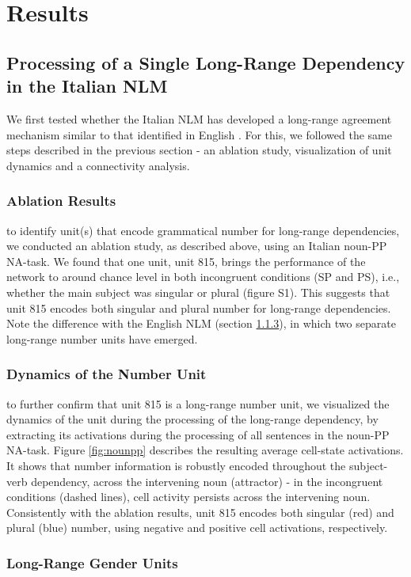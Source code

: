 \section{Results}
\subsection{Processing of a Single Long-Range Dependency in the Italian NLM}
We first tested whether the Italian NLM has developed a long-range agreement mechanism similar to that identified in English \citep{lakretz2019emergence}. For this, we followed the same steps described in the previous section - an ablation study, visualization of unit dynamics and a connectivity analysis. 

\subsubsection{Ablation Results} to identify unit(s) that encode grammatical number for long-range dependencies, we conducted an ablation study, as described above, using an Italian noun-PP NA-task. We found that one unit, unit 815, brings the performance of the network to around chance level in both incongruent conditions (SP and PS), i.e., whether the main subject was singular or plural (figure S1). This suggests that unit 815 encodes both singular and plural number for long-range dependencies. Note the difference with the English NLM (section \ref{}), in which two separate long-range number units have emerged. 

\subsubsection{Dynamics of the Number Unit} to further confirm that unit 815 is a long-range number unit, we visualized the dynamics of the unit during the processing of the long-range dependency, by extracting its activations during the processing of all sentences in the noun-PP NA-task. Figure \ref{fig:nounpp} describes the resulting average cell-state activations. It shows that number information is robustly encoded throughout the subject-verb dependency, across the intervening noun (attractor) - in the incongruent conditions (dashed lines), cell activity persists across the intervening noun. Consistently with the ablation results, unit 815 encodes both singular (red) and plural (blue) number, using negative and positive cell activations, respectively.

\subsubsection{Long-Range Gender Units}

